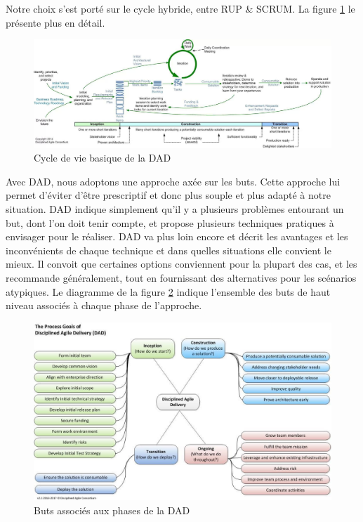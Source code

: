 \begin{spacing}{1.5}
Notre choix s'est porté sur le cycle hybride, entre RUP \& SCRUM. La figure \ref{fig:ScrumRUPcycleDAD} le présente plus en détail.
\begin{figure}[h]
\centering
\includegraphics[width=1\linewidth]{ScrumRUPcycleDAD.jpg}
\caption{Cycle de vie basique de la DAD}
\label{fig:ScrumRUPcycleDAD}
\end{figure}

Avec DAD, nous adoptons une approche axée sur les buts. Cette approche lui permet d'éviter d'être prescriptif et donc plus souple et plus adapté à notre situation. DAD indique simplement qu'il y a plusieurs problèmes entourant un but, dont l'on doit tenir compte, et propose plusieurs techniques pratiques à envisager pour le réaliser. DAD va plus loin encore et décrit les avantages et les inconvénients de chaque technique et dans quelles situations elle convient le mieux. Il convoit que certaines options conviennent pour la plupart des cas, et les recommande généralement, tout en fournissant des alternatives pour les scénarios atypiques. Le diagramme de la figure \ref{fig:goalsDAD} indique l'ensemble des buts de haut niveau associés à chaque phase de l'approche.

\begin{figure}[h]
\centering
\includegraphics[width=0.95\linewidth]{goalsDAD.jpg}
\caption{Buts associés aux phases de la DAD}
\label{fig:goalsDAD}
\end{figure}


\end{spacing}
